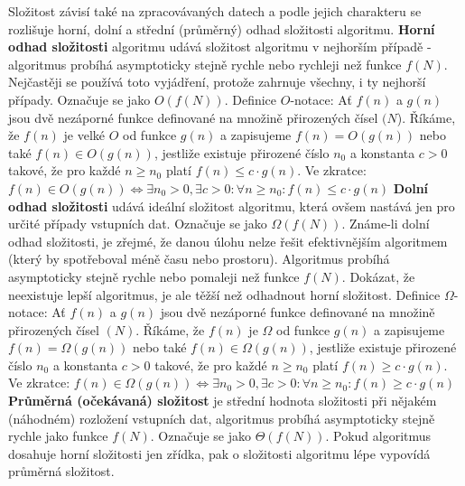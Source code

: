 \documentclass[12pt]{article}
\begin{document}
Složitost závisí také na zpracovávaných datech a podle jejich charakteru se rozlišuje horní, dolní a střední (průměrný) odhad složitosti algoritmu.
\newline
\indent
\textbf{Horní odhad složitosti} algoritmu udává složitost algoritmu v nejhorším případě - algoritmus probíhá asymptoticky stejně rychle nebo rychleji než funkce $f(N)$. Nejčastěji se používá toto vyjádření, protože zahrnuje všechny, i ty nejhorší případy. Označuje se jako $O(f(N))$.
\newline
Definice $O$-notace:
\newline
Ať $f(n)$ a $g(n)$ jsou dvě nezáporné funkce definované na množině přirozených čísel $(N$). Říkáme, že $f(n)$ je velké $O$ od funkce $g(n)$ a zapisujeme $f(n) = O(g(n))$ nebo také $f(n) \in O(g(n))$, jestliže existuje přirozené číslo $n_0$ a konstanta $c > 0$ takové, že pro každé $n \geq n_0$ platí $f(n) \leq c \cdot g(n)$.
\newline
Ve zkratce:
\newline
$f(n) \in O(g(n)) \Leftrightarrow \exists n_0 > 0, \exists c > 0:\forall n \geq n_0: f(n) \leq c \cdot g(n)$
\newline
\indent
\textbf{Dolní odhad složitosti} udává ideální složitost algoritmu, která ovšem nastává jen pro určité případy vstupních dat. Označuje se jako $\Omega(f(N))$. Známe-li dolní odhad složitosti, je zřejmé, že danou úlohu nelze řešit efektivnějším algoritmem (který by spotřeboval méně času nebo prostoru). Algoritmus probíhá asymptoticky stejně rychle nebo pomaleji než funkce $f(N)$. Dokázat, že neexistuje lepší algoritmus, je ale těžší než odhadnout horní složitost.
\newline
Definice $\Omega$-notace:
\newline
Ať $f(n)$ a $g(n)$ jsou dvě nezáporné funkce definované na množině přirozených čísel $(N)$. Říkáme, že $f(n)$ je $\Omega$ od funkce $g(n)$ a zapisujeme $f(n) = \Omega(g(n))$ nebo také $f(n) \in \Omega(g(n))$, jestliže existuje přirozené číslo $n_0$ a konstanta $c > 0$ takové, že pro každé $n \geq n_0$ platí $f(n) \geq c \cdot g(n)$.
\newline
Ve zkratce:
\newline
$f(n) \in \Omega(g(n)) \Leftrightarrow \exists n_0 > 0, \exists c > 0:\forall n \geq n_0: f(n) \geq c \cdot g(n)$
\newline
\indent
\textbf{Průměrná (očekávaná) složitost} je střední hodnota složitosti při nějakém (náhodném) rozložení vstupních dat, algoritmus probíhá asymptoticky stejně rychle jako funkce $f(N)$. Označuje se jako $\Theta(f(N))$. Pokud algoritmus dosahuje horní složitosti jen zřídka, pak o složitosti algoritmu lépe vypovídá průměrná složitost.
\end{document}
